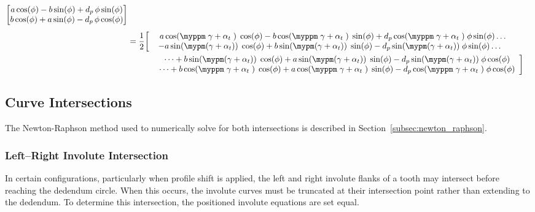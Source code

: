 \begin{subequations}
\begin{align}
\begin{bmatrix}
            a\cos(\phi) - b \sin(\phi) + d_p\,\phi\sin(\phi) \\
            b\cos(\phi) + a \sin(\phi) - d_p\,\phi\cos(\phi)
        \end{bmatrix}
\\[1ex]
    &= \frac{1}{2}\bigg[\begin{array}{cc}
            \phantom{-}a\cos(\myppm\;\gamma+\alpha_t\;)\;\cos(\phi)
            - b\cos(\myppm\;\gamma+\alpha_t\;)\;\sin(\phi)
                + d_p\cos(\myppm\;\gamma+\alpha_t\;)\;\phi\sin(\phi)\dots \\
            -a\sin(\mypm(\gamma+\alpha_t))\;\cos(\phi)
                +b\sin(\mypm(\gamma+\alpha_t))\;\sin(\phi)
                - d_p\sin(\mypm(\gamma+\alpha_t))\;\phi\sin(\phi)\dots
        \end{array}
\nonumber\\
        &\phantom{= \frac{1}{2}\bigg[}\begin{array}{cc}
            \hspace{1em}\dots + b\sin(\mypm(\gamma+\alpha_t))\;\cos(\phi)
                + a\sin(\mypm(\gamma+\alpha_t))\;\sin(\phi)
                - d_p\sin(\mypm(\gamma+\alpha_t))\;\phi\cos(\phi)\\
            \hspace{1em}\dots+ b\cos(\myppm\;\gamma+\alpha_t\;)\;\cos(\phi)
                + a\cos(\myppm\;\gamma+\alpha_t\;)\;\sin(\phi)
                - d_p\cos(\myppm\;\gamma+\alpha_t\;)\;\phi\cos(\phi)
        \end{array}\bigg]
\end{align}
\end{subequations}

\subsection{Curve Intersections}
\label{sec:curve_intersections}

The Newton-Raphson method used to numerically solve for both intersections is described in Section~\ref{subsec:newton_raphson}.

\subsubsection{Left--Right Involute Intersection}
In certain configurations, particularly when profile shift is applied, the left and right involute flanks of a tooth may intersect before reaching the dedendum circle. When this occurs, the involute curves must be truncated at their intersection point rather than extending to the dedendum. To determine this intersection, the positioned involute equations are set equal.

